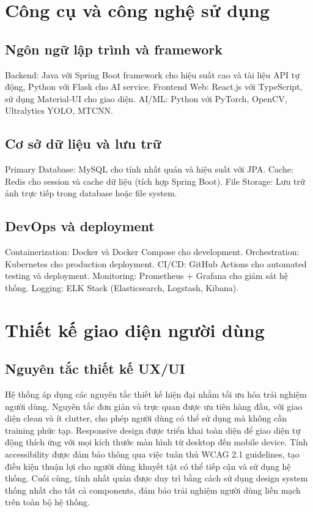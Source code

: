 \documentclass[12pt,a4paper]{report}
\begin{document}
\section{Công cụ và công nghệ sử dụng}
\subsection{Ngôn ngữ lập trình và framework}
Backend: Java với Spring Boot framework cho hiệu suất cao và tài liệu API tự động, Python với Flask cho AI service.
Frontend Web: React.js với TypeScript, sử dụng Material-UI cho giao diện.
AI/ML: Python với PyTorch, OpenCV, Ultralytics YOLO, MTCNN.

\subsection{Cơ sở dữ liệu và lưu trữ}
Primary Database: MySQL cho tính nhất quán và hiệu suất với JPA.
Cache: Redis cho session và cache dữ liệu (tích hợp Spring Boot).
File Storage: Lưu trữ ảnh trực tiếp trong database hoặc file system.

\subsection{DevOps và deployment}
Containerization: Docker và Docker Compose cho development.
Orchestration: Kubernetes cho production deployment.
CI/CD: GitHub Actions cho automated testing và deployment.
Monitoring: Prometheus + Grafana cho giám sát hệ thống.
Logging: ELK Stack (Elasticsearch, Logstash, Kibana).

\section{Thiết kế giao diện người dùng}
\subsection{Nguyên tắc thiết kế UX/UI}
Hệ thống áp dụng các nguyên tắc thiết kế hiện đại nhằm tối ưu hóa trải nghiệm người dùng. Nguyên tắc đơn giản và trực quan được ưu tiên hàng đầu, với giao diện clean và ít clutter, cho phép người dùng có thể sử dụng mà không cần training phức tạp. Responsive design được triển khai toàn diện để giao diện tự động thích ứng với mọi kích thước màn hình từ desktop đến mobile device. Tính accessibility được đảm bảo thông qua việc tuân thủ WCAG 2.1 guidelines, tạo điều kiện thuận lợi cho người dùng khuyết tật có thể tiếp cận và sử dụng hệ thống. Cuối cùng, tính nhất quán được duy trì bằng cách sử dụng design system thống nhất cho tất cả components, đảm bảo trải nghiệm người dùng liền mạch trên toàn bộ hệ thống.
\end{document}
